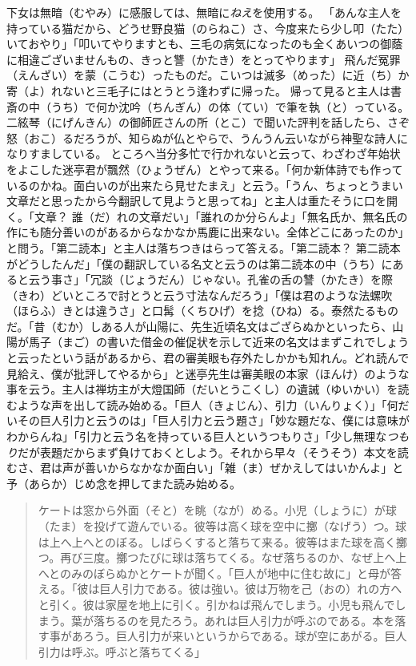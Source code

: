 \documentclass{book}
\begin{document}
下女は無暗（むやみ）に感服しては、無暗に\emph{ねえ}を使用する。
「あんな主人を持っている猫だから、どうせ野良猫（のらねこ）さ、今度来たら少し叩（たた）いておやり」「叩いてやりますとも、三毛の病気になったのも全くあいつの御蔭に相違ございませんもの、きっと讐（かたき）をとってやります」
飛んだ冤罪（えんざい）を蒙（こうむ）ったものだ。こいつは滅多（めった）に近（ち）か寄（よ）れないと三毛子にはとうとう逢わずに帰った。
帰って見ると主人は書斎の中（うち）で何か沈吟（ちんぎん）の体（てい）で筆を執（と）っている。二絃琴（にげんきん）の御師匠さんの所（とこ）で聞いた評判を話したら、さぞ怒（おこ）るだろうが、知らぬが仏とやらで、うんうん云いながら神聖な詩人になりすましている。
ところへ当分多忙で行かれないと云って、わざわざ年始状をよこした迷亭君が飄然（ひょうぜん）とやって来る。「何か新体詩でも作っているのかね。面白いのが出来たら見せたまえ」と云う。「うん、ちょっとうまい文章だと思ったから今翻訳して見ようと思ってね」と主人は重たそうに口を開く。「文章？ 誰（だ）れの文章だい」「誰れのか分らんよ」「無名氏か、無名氏の作にも随分善いのがあるからなかなか馬鹿に出来ない。全体どこにあったのか」と問う。「第二読本」と主人は落ちつきはらって答える。「第二読本？ 第二読本がどうしたんだ」「僕の翻訳している名文と云うのは第二読本の中（うち）にあると云う事さ」「冗談（じょうだん）じゃない。孔雀の舌の讐（かたき）を際（きわ）どいところで討とうと云う寸法なんだろう」「僕は君のような法螺吹（ほらふ）きとは違うさ」と口髯（くちひげ）を捻（ひね）る。泰然たるものだ。「昔（むか）しある人が山陽に、先生近頃名文はござらぬかといったら、山陽が馬子（まご）の書いた借金の催促状を示して近来の名文はまずこれでしょうと云ったという話があるから、君の審美眼も存外たしかかも知れん。どれ読んで見給え、僕が批評してやるから」と迷亭先生は審美眼の本家（ほんけ）のような事を云う。主人は禅坊主が大燈国師（だいとうこくし）の遺誡（ゆいかい）を読むような声を出して読み始める。「巨人（きょじん）、引力（いんりょく）」「何だいその巨人引力と云うのは」「巨人引力と云う題さ」「妙な題だな、僕には意味がわからんね」「引力と云う名を持っている巨人というつもりさ」「少し無理な\emph{つもり}だが表題だからまず負けておくとしよう。それから早々（そうそう）本文を読むさ、君は声が善いからなかなか面白い」「雑（ま）ぜかえしてはいかんよ」と予（あらか）じめ念を押してまた読み始める。
\blockquote{ケートは窓から外面（そと）を眺（なが）める。小児（しょうに）が球（たま）を投げて遊んでいる。彼等は高く球を空中に擲（なげう）つ。球は上へ上へとのぼる。しばらくすると落ちて来る。彼等はまた球を高く擲つ。再び三度。擲つたびに球は落ちてくる。なぜ落ちるのか、なぜ上へ上へとのみのぼらぬかとケートが聞く。「巨人が地中に住む故に」と母が答える。「彼は巨人引力である。彼は強い。彼は万物を己（おの）れの方へと引く。彼は家屋を地上に引く。引かねば飛んでしまう。小児も飛んでしまう。葉が落ちるのを見たろう。あれは巨人引力が呼ぶのである。本を落す事があろう。巨人引力が来いというからである。球が空にあがる。巨人引力は呼ぶ。呼ぶと落ちてくる」}
\end{document}

